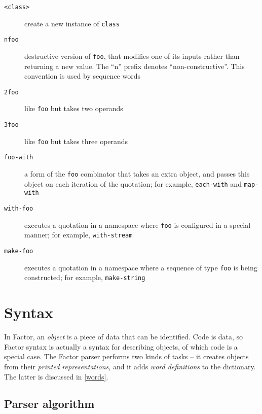 \documentclass{report}
\begin{document}
\begin{description}
\item[\texttt{<class>}] create a new instance of \texttt{class}
\item[\texttt{nfoo}] destructive version of \texttt{foo}, that modifies one of its inputs rather than returning a new value. The ``n'' prefix denotes ``non-constructive''. This convention is used by sequence words
\item[\texttt{2foo}] like \texttt{foo} but takes two operands
\item[\texttt{3foo}] like \texttt{foo} but takes three operands
\item[\texttt{foo-with}] a form of the \texttt{foo} combinator that takes an extra object, and passes this object on each iteration of the quotation; for example, \texttt{each-with} and \texttt{map-with}
\item[\texttt{with-foo}] executes a quotation in a namespace where \texttt{foo} is configured in a special manner; for example, \texttt{with-stream}
\item[\texttt{make-foo}] executes a quotation in a namespace where a sequence of type \texttt{foo} is being constructed; for example, \texttt{make-string}
\end{description}

\section{Syntax}
\newcommand{\parseglos}{}
\parseglos
In Factor, an \emph{object} is a piece of data that can be identified. Code is data, so Factor syntax is actually a syntax for describing objects, of which code is a special case.
The Factor parser performs two kinds of tasks -- it creates objects from their \emph{printed representations}, and it adds \emph{word definitions} to the dictionary. The latter is discussed in \ref{words}.

\subsection{\label{parser}Parser algorithm}

\end{document}
